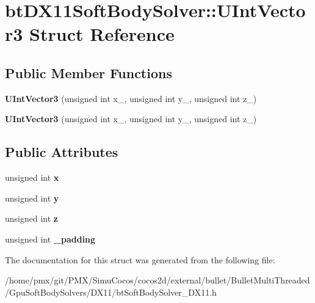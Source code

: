 \hypertarget{structbtDX11SoftBodySolver_1_1UIntVector3}{}\section{bt\+D\+X11\+Soft\+Body\+Solver\+:\+:U\+Int\+Vector3 Struct Reference}
\label{structbtDX11SoftBodySolver_1_1UIntVector3}
\subsection*{Public Member Functions}
\begin{DoxyCompactItemize}
\item 
\mbox{\label{structbtDX11SoftBodySolver_1_1UIntVector3_a60fbe4748f41c1043082b9e4d70b1421}} 
{\bfseries U\+Int\+Vector3} (unsigned int x\+\_\+, unsigned int y\+\_\+, unsigned int z\+\_\+)
\item 
\mbox{\label{structbtDX11SoftBodySolver_1_1UIntVector3_a60fbe4748f41c1043082b9e4d70b1421}} 
{\bfseries U\+Int\+Vector3} (unsigned int x\+\_\+, unsigned int y\+\_\+, unsigned int z\+\_\+)
\end{DoxyCompactItemize}
\subsection*{Public Attributes}
\begin{DoxyCompactItemize}
\item 
\mbox{\label{structbtDX11SoftBodySolver_1_1UIntVector3_ab08b2a5d0d7da85e784d0e67f755529e}} 
unsigned int {\bfseries x}
\item 
\mbox{\label{structbtDX11SoftBodySolver_1_1UIntVector3_a49229c84fecb12d7fdfa31a3c89d819c}} 
unsigned int {\bfseries y}
\item 
\mbox{\label{structbtDX11SoftBodySolver_1_1UIntVector3_a553a4c048c91046b206d642db0b4c17d}} 
unsigned int {\bfseries z}
\item 
\mbox{\label{structbtDX11SoftBodySolver_1_1UIntVector3_a809fa9a0399c7c06785ab0430744e236}} 
unsigned int {\bfseries \+\_\+padding}
\end{DoxyCompactItemize}


The documentation for this struct was generated from the following file\+:\begin{DoxyCompactItemize}
\item 
/home/pmx/git/\+P\+M\+X/\+Simu\+Cocos/cocos2d/external/bullet/\+Bullet\+Multi\+Threaded/\+Gpu\+Soft\+Body\+Solvers/\+D\+X11/bt\+Soft\+Body\+Solver\+\_\+\+D\+X11.\+h\end{DoxyCompactItemize}
